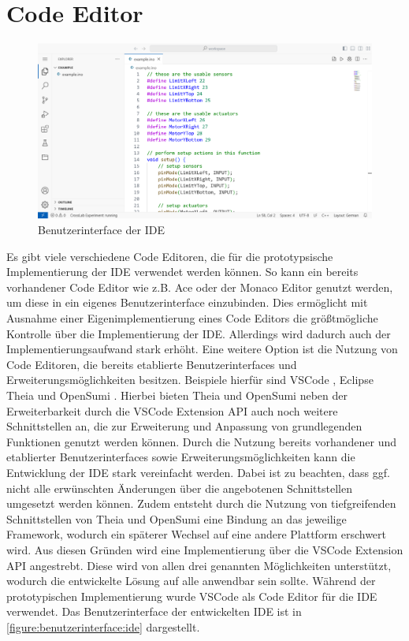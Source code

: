 \section{Code Editor}\label{section:prototypische-implementierung:code-editor}

\begin{figure}[tbp]
    \centering
    \includegraphics[trim={0 3px 0 0},clip,width=\textwidth]{images/editor.png}
    \caption{Benutzerinterface der IDE}
    \label{figure:benutzerinterface:ide}
\end{figure}

Es gibt viele verschiedene Code Editoren, die für die prototypsische Implementierung der IDE verwendet werden können. So kann ein bereits vorhandener Code Editor wie z.B. Ace \cite{noauthor_ace_nodate} oder der Monaco Editor \cite{noauthor_monaco_nodate} genutzt werden, um diese in ein eigenes Benutzerinterface einzubinden. Dies ermöglicht mit Ausnahme einer Eigenimplementierung eines Code Editors die größtmögliche Kontrolle über die Implementierung der IDE. Allerdings wird dadurch auch der Implementierungsaufwand stark erhöht. Eine weitere Option ist die Nutzung von Code Editoren, die bereits etablierte Benutzerinterfaces und Erweiterungsmöglichkeiten besitzen. Beispiele hierfür sind \ac{VSCode} \cite{noauthor_vscode_nodate}, Eclipse Theia \cite{noauthor_theia_nodate} und OpenSumi \cite{noauthor_opensumi_nodate}. Hierbei bieten Theia und OpenSumi neben der Erweiterbarkeit durch die VSCode Extension API \cite{noauthor_vscode-extension-api_nodate} auch noch weitere Schnittstellen an, die zur Erweiterung und Anpassung von grundlegenden Funktionen genutzt werden können. Durch die Nutzung bereits vorhandener und etablierter Benutzerinterfaces sowie Erweiterungsmöglichkeiten kann die Entwicklung der IDE stark vereinfacht werden. Dabei ist zu beachten, dass ggf. nicht alle erwünschten Änderungen über die angebotenen Schnittstellen umgesetzt werden können. Zudem entsteht durch die Nutzung von tiefgreifenden Schnittstellen von Theia und OpenSumi eine Bindung an das jeweilige Framework, wodurch ein späterer Wechsel auf eine andere Plattform erschwert wird. Aus diesen Gründen wird eine Implementierung über die VSCode Extension API angestrebt. Diese wird von allen drei genannten Möglichkeiten unterstützt, wodurch die entwickelte Lösung auf alle anwendbar sein sollte. Während der prototypischen Implementierung wurde \ac{VSCode} als Code Editor für die IDE verwendet. Das Benutzerinterface der entwickelten IDE ist in \autoref{figure:benutzerinterface:ide} dargestellt.
